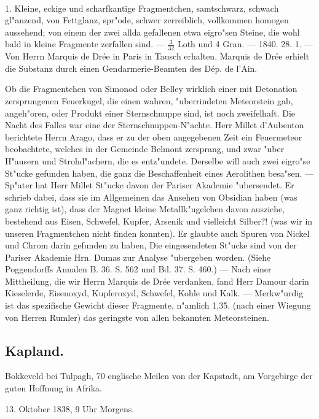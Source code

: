 \documentclass[a4paper, 11pt, oneside, polutonikogreek, german]{article}
\begin{document}
\paragraph{}
1. Kleine, eckige und scharfkantige Fragmentchen, samtschwarz, schwach gl"anzend, von Fettglanz, spr"ode, schwer zerreiblich, vollkommen homogen aussehend; von einem der zwei allda gefallenen etwa eigro"sen Steine, die wohl bald in kleine Fragmente zerfallen sind. --- $\frac{3}{32}$ Loth und 4 Gran. --- 1840. 28. 1. --- Von Herrn Marquis de Drée in Paris in Tausch erhalten. Marquis de Drée erhielt die Substanz durch einen Gendarmerie-Beamten des Dép. de l'Ain.

\setlength{\leftskip}{10mm}
\setlength{\parindent}{0pt}

{\footnotesize Ob die Fragmentchen von Simonod oder Belley wirklich einer mit Detonation zersprungenen Feuerkugel, die einen wahren, "uberrindeten Meteorstein gab, angeh"oren, oder Produkt einer Sternschnuppe sind, ist noch zweifelhaft. Die Nacht des Falles war eine der Sternschnuppen-N"achte. Herr Millet d’Aubenton berichtete Herrn Arago, dass er zu der oben angegebenen Zeit ein Feuermeteor beobachtete, welches in der Gemeinde Belmont zersprang, und zwar "uber H"ausern und Strohd"achern, die es entz"undete. Derselbe will auch zwei eigro"se St"ucke gefunden haben, die ganz die Beschaffenheit eines Aerolithen besa"sen. --- Sp"ater hat Herr Millet St"ucke davon der Pariser Akademie "ubersendet. Er schrieb dabei, dass sie im Allgemeinen das Ansehen von Obsidian haben (was ganz richtig ist), dass der Magnet kleine Metallk"ugelchen davon ausziehe, bestehend aus Eisen, Schwefel, Kupfer, Arsenik und vielleicht Silber?! (was wir in unseren Fragmentchen nicht finden konnten). Er glaubte auch Spuren von Nickel und Chrom darin gefunden zu haben, Die eingesendeten St"ucke sind von der Pariser Akademie Hrn. Dumas zur Analyse "ubergeben worden. (Siehe Poggendorffs Annalen B. 36. S. 562 und Bd. 37. S. 460.) --- Nach einer Mittheilung, die wir Herrn Marquis de Drée verdanken, fand Herr Damour darin Kieselerde, Eisenoxyd, Kupferoxyd, Schwefel, Kohle und Kalk. --- Merkw"urdig ist das spezifische Gewicht dieser Fragmente‚ n"amlich 1,35. (nach einer Wiegung von Herren Rumler) das geringste von allen bekannten Meteorsteinen.}

\setlength{\leftskip}{0pt}
\setlength{\parindent}{20pt}
\subsection{Kapland.}
\begin{center}
\small
Bokkeveld bei Tulpagh, 70 englische Meilen von der Kapstadt, am Vorgebirge der guten Hoffnung in Afrika.

13. Oktober 1838, 9 Uhr Morgens.
\end{center}
\end{document}
